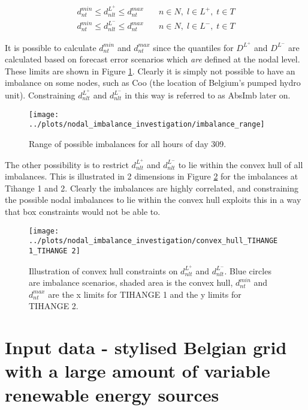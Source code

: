 \documentclass[number,times]{elsarticle}
\begin{document}
\begin{align}
    d_{nt}^{min} \leq d_{nlt}^{L^+} \leq d_{nt}^{max} & \quad n \in N, \; l \in L^+, \; t \in T \\
    d_{nt}^{min} \leq d_{nlt}^{L^-} \leq d_{nt}^{max} & \quad n \in N, \; l \in L^-, \; t \in T
\end{align}

It is possible to calculate $d_{nt}^{min}$ and $d_{nt}^{max}$ since the quantiles for $D^{L^+}$ and $D^{L^-}$ are calculated based on forecast error scenarios which \emph{are} defined at the nodal level. These limits are shown in Figure \ref{fig:imbalance_range}. Clearly it is simply not possible to have an imbalance on some nodes, such as Coo (the location of Belgium's pumped hydro unit). Constraining $d_{nlt}^{L^+}$ and $d_{nlt}^{L^-}$ in this way is referred to as AbsImb later on. 

\begin{figure}[ht]
    \centering
    \texttt{[image: ../plots/nodal\_imbalance\_investigation/imbalance\_range]}
    \caption{Range of possible imbalances for all hours of day 309.\label{fig:imbalance_range}}
\end{figure}

The other possibility is to restrict $d_{nlt}^{L^+}$ and $d_{nlt}^{L^-}$ to lie within the convex hull of all imbalances. This is illustrated in 2 dimensions in Figure \ref{fig:convex_hull_tihange} for the imbalances at Tihange 1 and 2. Clearly the imbalances are highly correlated, and constraining the possible nodal imbalances to lie within the convex hull exploits this in a way that box constraints would not be able to.

\begin{figure}[ht]
    \centering
    \texttt{[image: ../plots/nodal\_imbalance\_investigation/convex\_hull\_TIHANGE 1\_TIHANGE 2]}
    \caption{Illustration of convex hull constraints on $d_{nlt}^{L^+}$ and $d_{nlt}^{L^-}$. Blue circles are imbalance scenarios, shaded area is the convex hull, $d_{nt}^{min}$ and $d_{nt}^{max}$ are the x limits for TIHANGE 1 and the y limits for TIHANGE 2. \label{fig:convex_hull_tihange}}
\end{figure}

\section{Input data - stylised Belgian grid with a large amount of variable renewable energy sources}
\end{document}
